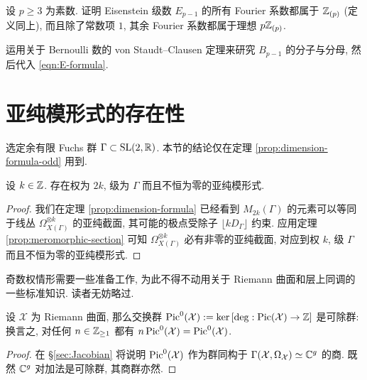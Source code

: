\begin{exercise}\label{exo:Deligne-congruence}
	设 $p \geq 3$ 为素数. 证明 Eisenstein 级数 $E_{p-1}$ 的所有 Fourier 系数都属于 $\mathbb{Z}_{(p)}$ (定义同上), 而且除了常数项 $1$, 其余 Fourier 系数都属于理想 $p \mathbb{Z}_{(p)}$.

	\begin{hint}
		运用关于 Bernoulli 数的 von Staudt--Clausen 定理来研究 $B_{p-1}$ 的分子与分母, 然后代入 \eqref{eqn:E-formula}.
	\end{hint}
\end{exercise}

\section{亚纯模形式的存在性}
选定余有限 Fuchs 群 $\Gamma \subset \operatorname{SL}(2,\mathbb{R})$. 本节的结论仅在定理 \ref{prop:dimension-formula-odd} 用到.

\begin{theorem}
	设 $k \in \mathbb{Z}$. 存在权为 $2k$, 级为 $\Gamma$ 而且不恒为零的亚纯模形式.
\end{theorem}
\begin{proof}
	我们在定理 \ref{prop:dimension-formula} 已经看到 $M_{2k}(\Gamma)$ 的元素可以等同于线丛 $\Omega_{X(\Gamma)}^{\otimes k}$ 的亚纯截面, 其可能的极点受除子 $\lfloor k D_\Gamma\rfloor$ 约束. 应用定理 \ref{prop:meromorphic-section} 可知 $\Omega_{X(\Gamma)}^{\otimes k}$ 必有非零的亚纯截面, 对应到权 $k$, 级 $\Gamma$ 而且不恒为零的亚纯模形式.
\end{proof}

奇数权情形需要一些准备工作, 为此不得不动用关于 Riemann 曲面和层上同调的一些标准知识. 读者无妨略过.
\begin{lemma}\label{prop:Jac-divisible}
	设 $\mathcal{X}$ 为 Riemann 曲面, 那么交换群 $\operatorname{Pic}^0(\mathcal{X}) := \operatorname{ker}\left[ \deg: \operatorname{Pic}(\mathcal{X}) \to \mathbb{Z} \right]$ 是可除群: 换言之, 对任何 $n \in \mathbb{Z}_{\geq 1}$ 都有 $n\operatorname{Pic}^0(\mathcal{X}) = \operatorname{Pic}^0(\mathcal{X})$.
\end{lemma}
\begin{proof}
	在 \S\ref{sec:Jacobian} 将说明 $\operatorname{Pic}^0(\mathcal{X})$ 作为群同构于 $\Gamma(\mathcal{X}, \Omega_{\mathcal{X}}) \simeq \mathbb{C}^g$ 的商. 既然 $\mathbb{C}^g$ 对加法是可除群, 其商群亦然.
\end{proof}

